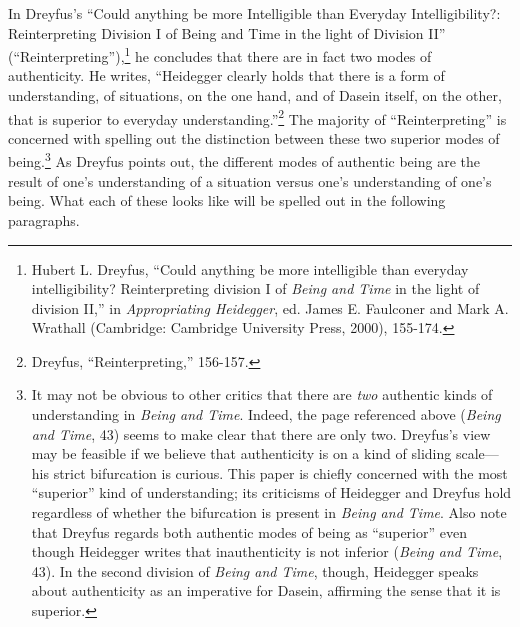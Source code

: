 In Dreyfus's ``Could anything be more Intelligible than Everyday
Intelligibility?: Reinterpreting Division I of Being and Time in the
light of Division II'' (``Reinterpreting''),\footnote{Hubert L. Dreyfus,
  ``Could anything be more intelligible than everyday
  intelligibility? Reinterpreting division I of \emph{Being and Time} in
  the light of division II,'' in \emph{Appropriating Heidegger}, ed.
  James E. Faulconer and Mark A. Wrathall (Cambridge: Cambridge
  University Press, 2000), 155-174.} he concludes that there are in fact
two modes of authenticity. He writes, ``Heidegger clearly holds that
there is a form of understanding, of situations, on the one hand, and of
Dasein itself, on the other, that is superior to everyday
understanding.''\footnote{Dreyfus, ``Reinterpreting,'' 156-157.} The
majority of ``Reinterpreting'' is concerned with spelling out the
distinction between these two superior modes of being.\footnote{It may
  not be obvious to other critics that there are \emph{two} authentic
  kinds of understanding in \emph{Being and Time}. Indeed, the page
  referenced above (\emph{Being and Time}, 43) seems to make clear that
  there are only two. Dreyfus's view may be feasible if we believe that
  authenticity is on a kind of sliding scale---his strict bifurcation is
  curious. This paper is chiefly concerned with the most ``superior''
  kind of understanding; its criticisms of Heidegger and Dreyfus hold
  regardless of whether the bifurcation is present in \emph{Being and
  Time}. Also note that Dreyfus regards both authentic modes of being as
  ``superior'' even though Heidegger writes that inauthenticity is not
  inferior (\emph{Being and Time}, 43). In the second division of
  \emph{Being and Time}, though, Heidegger speaks about authenticity as
  an imperative for Dasein, affirming the sense that it is superior.} As
Dreyfus points out, the different modes of authentic being are the
result of one's understanding of a situation versus one's understanding
of one's being. What each of these looks like will be spelled out in the
following paragraphs.

